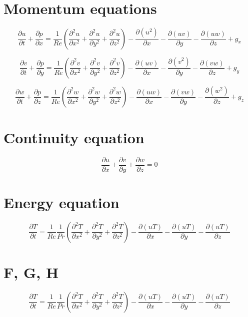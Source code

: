 \documentclass[10pt]{article}
\begin{document}
\section{Momentum equations}

\begin{equation}
\frac{\partial u}{\partial t} + \frac{\partial p}{\partial x} = 
\frac{1}{Re} \left( \frac{\partial^2 u}{\partial x^2} + \frac{\partial^2 u}{\partial y^2} + \frac{\partial^2 u}{\partial z^2} \right) - 
\frac{\partial(u^2)}{\partial x} -\frac{\partial (uv)}{\partial y} - 
\frac{\partial (uw)}{\partial z} +
g_x 
\end{equation}

\begin{equation}
\frac{\partial v}{\partial t} + \frac{\partial p}{\partial y} = 
\frac{1}{Re} \left( \frac{\partial^2 v}{\partial x^2} + \frac{\partial^2 v}{\partial y^2} + \frac{\partial^2 v}{\partial z^2} \right) - 
\frac{\partial(uv)}{\partial x} -\frac{\partial (v^2)}{\partial y} - 
\frac{\partial (vw)}{\partial z} +
g_y
\end{equation}

\begin{equation}
\frac{\partial w}{\partial t} + \frac{\partial p}{\partial z} = 
\frac{1}{Re} \left( \frac{\partial^2 w}{\partial x^2} + \frac{\partial^2 w}{\partial y^2} + \frac{\partial^2 w}{\partial z^2} \right) - 
\frac{\partial(uw)}{\partial x} -\frac{\partial (vw)}{\partial y} - 
\frac{\partial (w^2)}{\partial z} +
g_z
\end{equation}

\section{Continuity equation}

\begin{equation}
\frac{\partial u}{\partial x} + \frac{\partial v}{\partial y} + \frac{\partial w}{\partial z} = 0
\end{equation}

\section{Energy equation}

\begin{equation}
\frac{\partial T}{\partial t} = 
\frac{1}{Re} \frac{1}{Pr} \left( \frac{\partial^2 T}{\partial x^2} + \frac{\partial^2 T}{\partial y^2} + \frac{\partial^2 T}{\partial z^2} \right) - 
\frac{\partial(uT)}{\partial x} -\frac{\partial (uT)}{\partial y} - 
\frac{\partial (uT)}{\partial z}
\end{equation}

\section{F, G, H}

\begin{equation}
\frac{\partial T}{\partial t} = 
\frac{1}{Re} \frac{1}{Pr} \left( \frac{\partial^2 T}{\partial x^2} + \frac{\partial^2 T}{\partial y^2} + \frac{\partial^2 T}{\partial z^2} \right) - 
\frac{\partial(uT)}{\partial x} -\frac{\partial (uT)}{\partial y} - 
\frac{\partial (uT)}{\partial z}
\end{equation}
\end{document}

